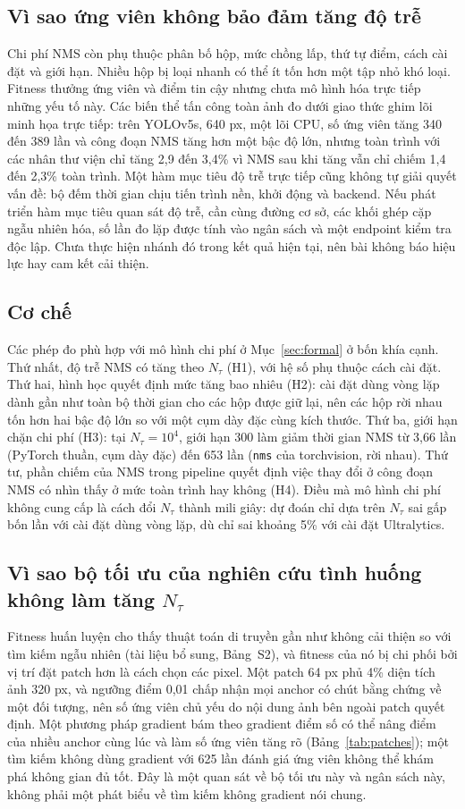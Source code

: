 \documentclass[12pt,a4paper]{article}
\newcommand{\Ntau}{N_{\tau}}
\begin{document}
\subsection{Vì sao ứng viên không bảo đảm tăng độ trễ}
Chi phí NMS còn phụ thuộc phân bố hộp, mức chồng lấp, thứ tự điểm, cách cài đặt và giới hạn. Nhiều hộp bị loại nhanh có thể ít tốn hơn một tập nhỏ khó loại. Fitness thưởng ứng viên và điểm tin cậy nhưng chưa mô hình hóa trực tiếp những yếu tố này. Các biến thể tấn công toàn ảnh đo dưới giao thức ghim lõi minh họa trực tiếp: trên YOLOv5s, 640 px, một lõi CPU, số ứng viên tăng 340 đến 389 lần và công đoạn NMS tăng hơn một bậc độ lớn, nhưng toàn trình với các nhân thư viện chỉ tăng 2,9 đến 3,4\% vì NMS sau khi tăng vẫn chỉ chiếm 1,4 đến 2,3\% toàn trình. Một hàm mục tiêu độ trễ trực tiếp cũng không tự giải quyết vấn đề: bộ đếm thời gian chịu tiến trình nền, khởi động và backend. Nếu phát triển hàm mục tiêu quan sát độ trễ, cần cùng đường cơ sở, các khối ghép cặp ngẫu nhiên hóa, số lần đo lặp được tính vào ngân sách và một endpoint kiểm tra độc lập. Chưa thực hiện nhánh đó trong kết quả hiện tại, nên bài không báo hiệu lực hay cam kết cải thiện.

\subsection{Cơ chế}
Các phép đo phù hợp với mô hình chi phí ở Mục~\ref{sec:formal} ở bốn khía cạnh. Thứ nhất, độ trễ NMS có tăng theo $\Ntau$ (H1), với hệ số phụ thuộc cách cài đặt. Thứ hai, hình học quyết định mức tăng bao nhiêu (H2): cài đặt dùng vòng lặp dành gần như toàn bộ thời gian cho các hộp được giữ lại, nên các hộp rời nhau tốn hơn hai bậc độ lớn so với một cụm dày đặc cùng kích thước. Thứ ba, giới hạn chặn chi phí (H3): tại $\Ntau=10^4$, giới hạn 300 làm giảm thời gian NMS từ 3,66 lần (PyTorch thuần, cụm dày đặc) đến 653 lần (\texttt{nms} của torchvision, rời nhau). Thứ tư, phần chiếm của NMS trong pipeline quyết định việc thay đổi ở công đoạn NMS có nhìn thấy ở mức toàn trình hay không (H4). Điều mà mô hình chi phí không cung cấp là cách đổi $\Ntau$ thành mili giây: dự đoán chỉ dựa trên $\Ntau$ sai gấp bốn lần với cài đặt dùng vòng lặp, dù chỉ sai khoảng 5\% với cài đặt Ultralytics.

\subsection{Vì sao bộ tối ưu của nghiên cứu tình huống không làm tăng $\Ntau$}
Fitness huấn luyện cho thấy thuật toán di truyền gần như không cải thiện so với tìm kiếm ngẫu nhiên (tài liệu bổ sung, Bảng~S2), và fitness của nó bị chi phối bởi vị trí đặt patch hơn là cách chọn các pixel. Một patch 64 px phủ 4\% diện tích ảnh 320 px, và ngưỡng điểm 0,01 chấp nhận mọi anchor có chút bằng chứng về một đối tượng, nên số ứng viên chủ yếu do nội dung ảnh bên ngoài patch quyết định. Một phương pháp gradient bám theo gradient điểm số có thể nâng điểm của nhiều anchor cùng lúc và làm số ứng viên tăng rõ (Bảng~\ref{tab:patches}); một tìm kiếm không dùng gradient với 625 lần đánh giá ứng viên không thể khám phá không gian đủ tốt. Đây là một quan sát về bộ tối ưu này và ngân sách này, không phải một phát biểu về tìm kiếm không gradient nói chung.
\end{document}
